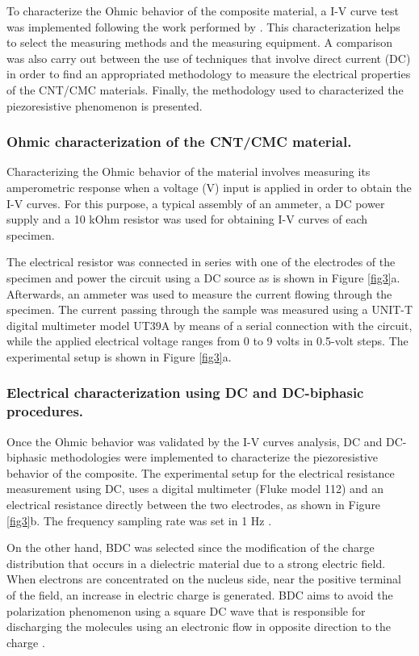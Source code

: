 \documentclass[twocolumn]{bmcart}%
\begin{document}
To characterize the Ohmic behavior of the composite material, a I-V curve test  was implemented following the work performed by \cite{Han2015a}. This characterization helps to select the measuring methods and the measuring equipment. A comparison was also carry out between the use of techniques that involve direct current (DC) in order to find an appropriated methodology to measure the electrical properties of the CNT/CMC materials. Finally, the methodology used to characterized the piezoresistive phenomenon is presented.

\subsubsection{Ohmic characterization of the CNT/CMC material.}

Characterizing the Ohmic behavior of the material involves measuring its  amperometric response when a voltage (V) input is applied in order to obtain the I-V curves. For this purpose, a typical assembly \cite{YORKE1981200} of an ammeter, a DC power supply and a 10 kOhm resistor was used for obtaining I-V curves of each specimen.

The electrical resistor was connected in series with one of the electrodes of the specimen and power the circuit using a DC source  as is shown in Figure \ref{fig3}a. Afterwards, an ammeter was used to measure the current flowing through the specimen. The current passing through the sample was measured using a UNIT-T digital multimeter model UT39A by means of a serial connection with the circuit, while the applied electrical voltage ranges from 0 to 9 volts in 0.5-volt steps. The experimental setup is shown in Figure \ref{fig3}a.


\subsubsection{Electrical characterization using DC and DC-biphasic procedures.}

Once the Ohmic behavior was validated by the I-V curves analysis, DC and DC-biphasic methodologies were implemented to characterize the piezoresistive behavior of the composite. The experimental setup for the electrical resistance measurement using DC, uses a digital multimeter (Fluke model 112) and an electrical resistance directly between the two electrodes, as shown in Figure \ref{fig3}b. The frequency  sampling rate was set in 1 Hz \cite{Downey2017, Coppola2011, Dong2016}.

On the other hand, BDC was selected since the modification of the charge distribution that occurs in a dielectric material due to a strong electric field. When electrons are concentrated on the nucleus side, near the positive terminal of the field, an increase in electric charge is generated. BDC aims to avoid the polarization phenomenon using a square DC wave that is responsible for discharging the molecules using an electronic flow in opposite direction to the charge \cite{Downey2017a, BOTTCHER1973}.
\end{document}
